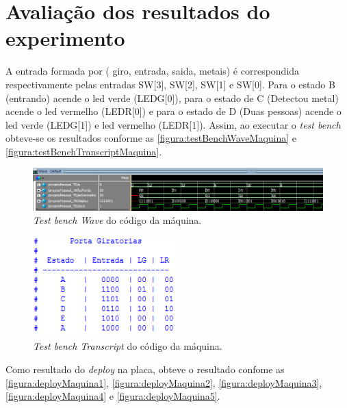 \chapter{Avaliação dos resultados do experimento}
	A entrada formada por ( giro, entrada, saida, metais) é correspondida respectivamente pelas entradas
	SW[3], SW[2], SW[1] e SW[0]. Para o estado B (entrando) acende o \ac{led} verde (LEDG[0]),
	para o estado de C (Detectou metal) acende o \ac{led} vermelho (LEDR[0]) e
	para o estado de D (Duas pessoas) acende o \ac{led} verde (LEDG[1]) e \ac{led}
	 vermelho (LEDR[1]). Assim, ao executar o
	\textit{test bench} obteve-se os resultados conforme as
	\autoref{figura:testBenchWaveMaquina} e \autoref{figura:testBenchTranscriptMaquina}.

	\begin{figure}[H]
		 \centering
		 \caption{\label{figura:testBenchWaveMaquina}\textit{Test bench Wave} do código da máquina.}
		 \includegraphics[width=1\textwidth]{img/wave}
	\end{figure}

	\begin{figure}[H]
		 \centering
		 \caption{\label{figura:testBenchTranscriptMaquina}\textit{Test bench Transcript} do código da máquina.}
		 \includegraphics[width=0.5\textwidth]{img/transcript}
	\end{figure}

	Como resultado do \textit{deploy} na placa, obteve o resultado confome as
	\autoref{figura:deployMaquina1}, \autoref{figura:deployMaquina2}, \autoref{figura:deployMaquina3},
	\autoref{figura:deployMaquina4} e \autoref{figura:deployMaquina5}.


